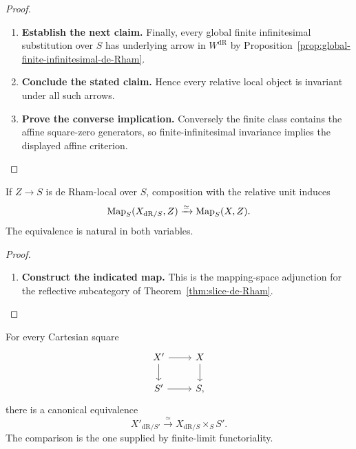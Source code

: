 \begin{proof}
\begin{enumerate}[label=\textup{(\arabic*)}]
    standing universe enlargement these tests form a small set, so they also exhibit
    \(L^{\mathrm{dR}}_S\) as the corresponding set-generated localization of the
    presentable slice.
    \item \textbf{Establish the next claim.}
    Finally, every global finite infinitesimal substitution over \(S\) has underlying
    arrow in \(W^{\mathrm{dR}}\) by
    Proposition~\ref{prop:global-finite-infinitesimal-de-Rham}.
    \item \textbf{Conclude the stated claim.}
    Hence every relative
    local object is invariant under all such arrows.
    \item \textbf{Prove the converse implication.}
    Conversely the finite class
    contains the affine square-zero generators, so finite-infinitesimal invariance
    implies the displayed affine criterion.
\end{enumerate}
\end{proof}

\begin{proposition}
\label{prop:relative-de-Rham-universal-mapping}
If \(Z\to S\) is de Rham-local over \(S\), composition with the relative unit induces
\[
  \operatorname{Map}_S(X_{\mathrm{dR}/S},Z)
  \xrightarrow{\simeq}
  \operatorname{Map}_S(X,Z).
\]
The equivalence is natural in both variables.
\end{proposition}

\begin{proof}
\leavevmode
\begin{enumerate}[label=\textup{(\arabic*)}]
    \item \textbf{Construct the indicated map.}
    This is the mapping-space adjunction for the reflective subcategory of
    Theorem~\ref{thm:slice-de-Rham}.
\end{enumerate}
\end{proof}

\begin{theorem}
\label{thm:relative-de-Rham-base-change}
For every Cartesian square
\[
\begin{tikzcd}
X' \ar[r] \ar[d] & X \ar[d]\\
S' \ar[r] & S,
\end{tikzcd}
\]
there is a canonical equivalence
\[
  X'_{\mathrm{dR}/S'}
  \xrightarrow{\simeq}
  X_{\mathrm{dR}/S}\times_SS'.
\]
The comparison is the one supplied by finite-limit functoriality.
\end{theorem}

